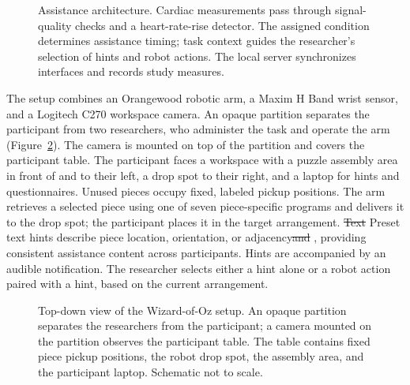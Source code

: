 \documentclass[sigconf,anonymous,balance=false]{aamas} %
\DeclareRobustCommand{\DIFadd}[1]{{\color{reviewadd}#1}} %
\DeclareRobustCommand{\DIFdel}[1]{{\color{reviewdel}\sout{#1}}} %
\providecommand{\DIFaddbegin}{} %
\providecommand{\DIFaddend}{} %
\providecommand{\DIFdelbegin}{} %
\providecommand{\DIFdelend}{} %
\providecommand{\DIFscaledelfig}{0.5}
\newlength{\DIFdelgraphicswidth} %
\newlength{\DIFdelgraphicsheight} %
\providecommand{\DIFaddincludegraphics}[2][]{{\color{blue}\fbox{\DIFOincludegraphics[#1]{#2}}}} %
\providecommand{\DIFdelincludegraphics}[2][]{%
\sbox{\DIFdelgraphicsbox}{\DIFOincludegraphics[#1]{#2}}%
\settoboxwidth{\DIFdelgraphicswidth}{\DIFdelgraphicsbox} %
\settoboxtotalheight{\DIFdelgraphicsheight}{\DIFdelgraphicsbox} %
\scalebox{\DIFscaledelfig}{%
\parbox[b]{\DIFdelgraphicswidth}{\usebox{\DIFdelgraphicsbox}\\[-\baselineskip] \rule{\DIFdelgraphicswidth}{0em}}\llap{\resizebox{\DIFdelgraphicswidth}{\DIFdelgraphicsheight}{%
\setlength{\unitlength}{\DIFdelgraphicswidth}%
\begin{picture}(1,1)%
\thicklines\linethickness{2pt} %
{\color[rgb]{1,0,0}\put(0,0){\framebox(1,1){}}}%
{\color[rgb]{1,0,0}\put(0,0){\line( 1,1){1}}}%
{\color[rgb]{1,0,0}\put(0,1){\line(1,-1){1}}}%
\end{picture}%
}\hspace*{3pt}}} %
} %
\DeclareRobustCommand{\DIFaddbegin}{\DIFOaddbegin \let\includegraphics\DIFaddincludegraphics} %
\DeclareRobustCommand{\DIFaddend}{\DIFOaddend \let\includegraphics\DIFOincludegraphics} %
\DeclareRobustCommand{\DIFdelbegin}{\DIFOdelbegin \let\includegraphics\DIFdelincludegraphics} %
\DeclareRobustCommand{\DIFdelend}{\DIFOaddend \let\includegraphics\DIFOincludegraphics} %
\begin{document}
\begin{figure}[t]
\centering
\begingroup
\resizebox{.96\textwidth}{!}{}
\endgroup
\caption{Assistance architecture. Cardiac measurements pass through signal-quality checks and a heart-rate-rise detector. The assigned condition determines assistance timing; task context guides the researcher’s selection of hints and robot actions. The local server synchronizes interfaces and records study measures.}
\label{fig:architecture}
\end{figure}

The setup combines an Orangewood robotic arm, a Maxim H Band wrist sensor, and a Logitech C270 workspace camera. An opaque partition separates the participant from two researchers, who administer the task and operate the arm (Figure~\ref{fig:setup}). The camera is mounted on top of the partition and covers the participant table. The participant faces a workspace with a puzzle assembly area in front of and to their left, a drop spot to their right, and a laptop for hints and questionnaires. Unused pieces occupy fixed, labeled pickup positions. The arm retrieves a selected piece using one of seven piece-specific programs and delivers it to the drop spot; the participant places it in the target arrangement. \DIFdelbegin \DIFdel{Text }\DIFdelend \DIFaddbegin \DIFadd{Preset text }\DIFaddend hints describe piece location, orientation, or adjacency\DIFdelbegin \DIFdel{and }\DIFdelend \DIFaddbegin \DIFadd{, providing consistent assistance content across participants. Hints }\DIFaddend are accompanied by an audible notification. \DIFaddbegin \DIFadd{The researcher selects either a hint alone or a robot action paired with a hint, based on the current arrangement.
}\DIFaddend 

\begin{figure}[t]
\centering
\begingroup
\resizebox{.83\textwidth}{!}{}
\endgroup
\caption{Top-down view of the Wizard-of-Oz setup. An opaque partition separates the researchers from the participant; a camera mounted on the partition observes the participant table. The table contains fixed piece pickup positions, the robot drop spot, the assembly area, and the participant laptop. Schematic not to scale.}
\label{fig:setup}
\end{figure}
\end{document}
